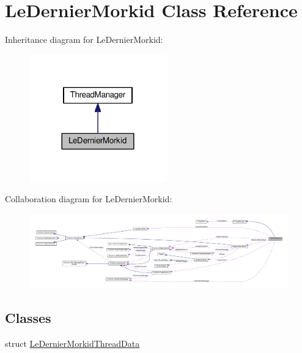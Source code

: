 \hypertarget{class_le_dernier_morkid}{}\section{Le\+Dernier\+Morkid Class Reference}
\label{class_le_dernier_morkid}


Inheritance diagram for Le\+Dernier\+Morkid\+:\nopagebreak
\begin{figure}[H]
\begin{center}
\leavevmode
\includegraphics[width=168pt]{class_le_dernier_morkid__inherit__graph}
\end{center}
\end{figure}


Collaboration diagram for Le\+Dernier\+Morkid\+:\nopagebreak
\begin{figure}[H]
\begin{center}
\leavevmode
\includegraphics[width=350pt]{class_le_dernier_morkid__coll__graph}
\end{center}
\end{figure}
\subsection*{Classes}
\begin{DoxyCompactItemize}
\item 
struct \hyperlink{struct_le_dernier_morkid_1_1_le_dernier_morkid_thread_data}{Le\+Dernier\+Morkid\+Thread\+Data}
\end{DoxyCompactItemize}
